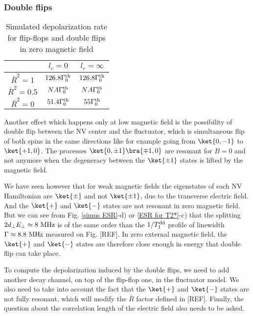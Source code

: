 \documentclass[a4paper,11pt]{report}
\begin{document}
\subsubsection{Double flips}

\begin{table}[htbp]
\centering
\caption{Simulated depolarization rate for flip-flops and double flips in zero magnetic field}
 \label{table double flips}
\begin{tabular}{c|cc}
{} & $l_c=0$ & $l_c=\infty$ \\
\midrule
$\bar{R}^2=1$ & $126.8 \Gamma_0^{\rm th}$ & $126.8 \Gamma_0^{\rm th}$ \\
$\bar{R}^2=0.5$ & $NA \Gamma_0^{\rm th}$ & $NA \Gamma_0^{\rm th}$ \\
$\bar{R}^2=0$ & $51.4 \Gamma_0^{\rm th}$ & $55 \Gamma_0^{\rm th}$ \\
\end{tabular}
\end{table}

Another effect which happens only at low magnetic field is the possibility of double flip between the NV center and the fluctuator, which is simultaneous flip of both spins in the same directions like for example going from $\ket{0,-1}$ to $\ket{+1,0}$. The processes $\ket{0, \pm 1}\bra{\mp 1,0}$ are resonant for $B=0$ and not anymore when the degeneracy between the $\ket{\pm 1}$ states is lifted by the magnetic field.

We have seen however that for weak magnetic fields the eigenstates of each NV Hamiltonian are $\ket{\pm}$ and not $\ket{\pm 1}$, due to the transverse electric field. And the $\ket{+}$ and $\ket{-}$ states are not resonant in zero magnetic field. But we can see from Fig. \ref{simus ESR}-d) or \ref{ESR for T2*}-c) that the splitting $2 d_\perp E_\perp \approx 8\ \rm MHz$ is of the same order than the $1/T_1^{\rm dd}$ profile of linewidth $\Gamma \approx 8.8\ \rm MHz$ measured on Fig. [REF]. In zero external magnetic field, the $\ket{+}$ and $\ket{-}$ states are therefore close enough in energy that double flip can take place.

To compute the depolarization induced by the double flips, we need to add another decay channel, on top of the flip-flop one, in the fluctuator model. We also need to take into account the fact that the $\ket{+}$ and $\ket{-}$ states are not fully resonant, which will modify the $\bar{R}$ factor defined in [REF]. Finally, the question about the correlation  length of the electric field also needs to be asked.
\end{document}
